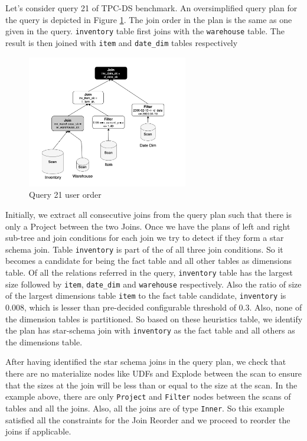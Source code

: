 Let's consider query 21 of TPC-DS benchmark. An oversimplified query plan for the query is depicted in Figure \ref{without-reorder}. The join order in the plan is the same as one given in the query. \texttt{inventory} table first joins with the \texttt{warehouse} table. The result is then joined with \texttt{item} and \texttt{date\_dim} tables respectively

\begin{figure}[ht]
\centerline{\includegraphics[width=7cm]{fig/without-reorder.png}}
\caption{Query 21 user order}
\label{without-reorder}
\end{figure}

Initially, we extract all consecutive joins from the query plan such that there is only a Project between the two Joins. Once we have the plans of left and right sub-tree and join conditions for each join we try to detect if they form a star schema join. Table \texttt{inventory} is part of the of all three join conditions. So it becomes a candidate for being the fact table and all other tables as dimensions table. Of all the relations referred in the query, \texttt{inventory} table has the largest size followed by \texttt{item}, \texttt{date\_dim} and \texttt{warehouse} respectively. Also the ratio of size of the largest dimensions table \texttt{item} to the fact table candidate, \texttt{inventory} is 0.008, which is lesser than pre-decided configurable threshold of 0.3. Also, none of the dimension tables is partitioned. So based on these heuristics table, we identify the plan has star-schema join with \texttt{inventory} as the fact table and all others as the dimensions table.

After having identified the star schema joins in the query plan, we check that there are no materialize nodes like UDFs and Explode between the scan to ensure that the sizes at the join will be less than or equal to the size at the scan. In the example above, there are only \texttt{Project} and \texttt{Filter} nodes between the scans of tables and all the joins. Also, all the joins are of type \texttt{Inner}. So this example satisfied all the constraints for the Join Reorder and we proceed to reorder the joins if applicable.

